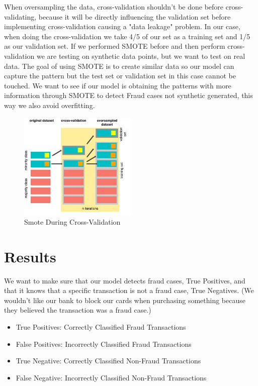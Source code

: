 \documentclass[conference]{IEEEtran}
\begin{document}
When oversampling the data, cross-validation shouldn't be done before cross-validating, because it will be directly influencing the validation set before implementing cross-validation causing a "data leakage" problem. In our case, when doing the cross-validation we take 4/5 of our set as a training set and 1/5 as our validation set. If we performed SMOTE before and then perform cross-validation we are testing on synthetic data points, but we want to test on real data. The goal of using SMOTE is to create similar data so our model can capture the pattern but the test set or validation set in this case cannot be touched. We want to see if our model is obtaining the patterns with more information through SMOTE to detect Fraud cases not synthetic generated, this way we also avoid overfitting.

\begin{figure}[H]
        \centering\includegraphics[width=0.5\textwidth]{images/smote_during_cv.jpeg}
    \caption{Smote During Cross-Validation}
    \label{fig:smote_cv}
\end{figure}

\section{Results}

We want to make sure that our model detects fraud cases, True Positives, and that it knows that a specific transaction is not a fraud case, True Negatives. (We wouldn't like our bank to block our cards when purchasing something because they believed the transaction was a fraud case.)

\begin{itemize}
\item True Positives: Correctly Classified Fraud Transactions
\item False Positives: Incorrectly Classified Fraud Transactions
\item True Negative: Correctly Classified Non-Fraud Transactions
\item False Negative: Incorrectly Classified Non-Fraud Transactions
\end{itemize}
\end{document}
